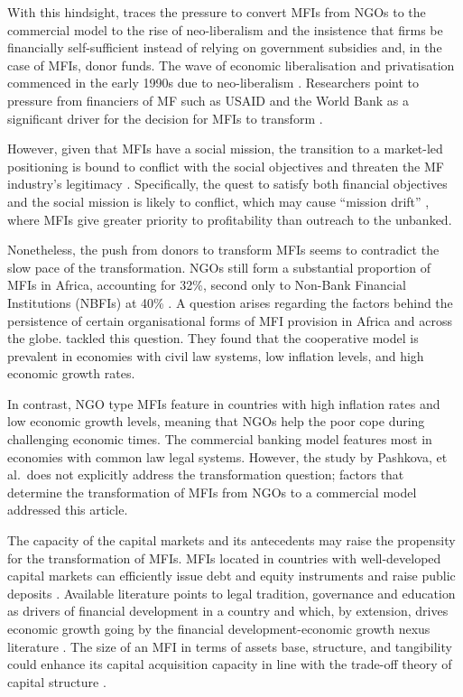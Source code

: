 \documentclass[a4paper,nobind]{templates/ociamthesis}
\begin{document}
With this hindsight, \textcite{bateman2010doesn} traces the pressure to convert MFIs from NGOs to the commercial model to the rise of neo-liberalism and the insistence that firms be financially self-sufficient instead of relying on government subsidies and, in the case of MFIs, donor funds. The wave of economic liberalisation and privatisation commenced in the early 1990s due to neo-liberalism \autocite{silva1998neoliberalism}. Researchers point to pressure from financiers of MF such as USAID and the World Bank as a significant driver for the decision for MFIs to transform \autocite{ostry2017}.

However, given that MFIs have a social mission, the transition to a market-led positioning is bound to conflict with the social objectives and threaten the MF industry's legitimacy \autocite{ramus2017,nason2018behavioral}. Specifically, the quest to satisfy both financial objectives and the social mission is likely to conflict, which may cause ``mission drift'' \autocite{mersland2010microfinance,mia2017mission}, where MFIs give greater priority to profitability than outreach to the unbanked.

Nonetheless, the push from donors to transform MFIs seems to contradict the slow pace of the transformation. NGOs still form a substantial proportion of MFIs in Africa, accounting for 32\%, second only to Non-Bank Financial Institutions (NBFIs) at 40\% \autocite{market2018global}. A question arises regarding the factors behind the persistence of certain organisational forms of MFI provision in Africa and across the globe. \textcite{pashkova2016business} tackled this question. They found that the cooperative model is prevalent in economies with civil law systems, low inflation levels, and high economic growth rates.

In contrast, NGO type MFIs feature in countries with high inflation rates and low economic growth levels, meaning that NGOs help the poor cope during challenging economic times. The commercial banking model features most in economies with common law legal systems. However, the study by Pashkova, et al.~does not explicitly address the transformation question; factors that determine the transformation of MFIs from NGOs to a commercial model addressed this article.

The capacity of the capital markets and its antecedents may raise the propensity for the transformation of MFIs. MFIs located in countries with well-developed capital markets can efficiently issue debt and equity instruments and raise public deposits \autocite{allen2013resolving,allen2014african}. Available literature points to legal tradition, governance and education as drivers of financial development in a country \autocite{rajan1998financial,baltagi2009financial} and which, by extension, drives economic growth going by the financial development-economic growth nexus literature \autocite{claessens2003financial}. The size of an MFI in terms of assets base, structure, and tangibility could enhance its capital acquisition capacity in line with the trade-off theory of capital structure \autocite{barclay2005capital,gwatidzo2009corporate,ojah2016effects}.
\end{document}
